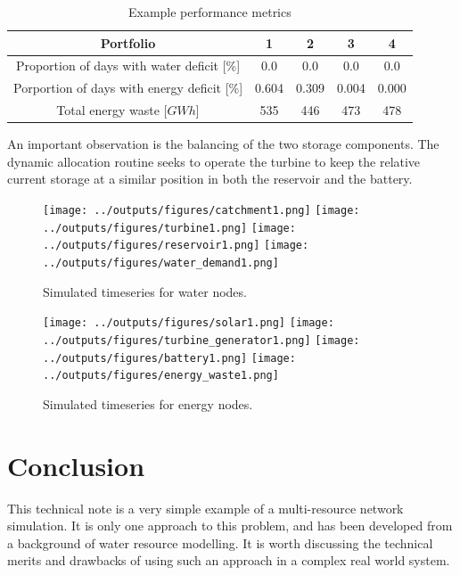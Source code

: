 \documentclass[11pt,twoside,a4paper]{article}
\begin{document}
\begin{table}
\begin{tabular}{| c | c | c | c | c |}
\hline
Portfolio & 1 & 2 & 3 & 4 \\
\hline
Proportion of days with water deficit [\%] & 0.0 & 0.0 & 0.0 & 0.0 \\
Porportion of days with energy deficit [\%] & 0.604 & 0.309 & 0.004 & 0.000 \\
Total energy waste [$GWh$] & 535 & 446 & 473 & 478 \\
\hline
\end{tabular}
\caption{Example performance metrics}
\label{tbl:metrics}
\end{table}

An important observation is the balancing of the two storage components. The dynamic allocation routine seeks to operate the turbine to keep the relative current storage at a similar position in both the reservoir and the battery.


\begin{figure}
    \centering
    \texttt{[image: ../outputs/figures/catchment1.png]}
    \texttt{[image: ../outputs/figures/turbine1.png]}
    \texttt{[image: ../outputs/figures/reservoir1.png]}
    \texttt{[image: ../outputs/figures/water\_demand1.png]}
    \caption{Simulated timeseries for water nodes.}
    \label{fig:water_timeseries}
\end{figure}

\begin{figure}
    \centering
    \texttt{[image: ../outputs/figures/solar1.png]}
    \texttt{[image: ../outputs/figures/turbine\_generator1.png]}
    \texttt{[image: ../outputs/figures/battery1.png]}
    \texttt{[image: ../outputs/figures/energy\_waste1.png]}
    \caption{Simulated timeseries for energy nodes.}
    \label{fig:energy_timeseries}
\end{figure}



\section{Conclusion}

This technical note is a very simple example of a multi-resource network simulation. It is only one approach to this problem, and has been developed from a background of water resource modelling. It is worth discussing the technical merits and drawbacks of using such an approach in a complex real world system.
\end{document}
